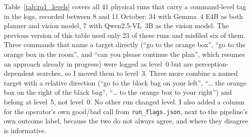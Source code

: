 %
%

\label{sec:rq1_results}

Table~\ref{tab:rq1_levels} covers all 41 physical runs that carry a command-level tag in the logs, recorded between
8 and 11 October: 34 with Gemma~4 E4B as both planner and vision model, 7 with Qwen2.5-VL~3B as the vision model.
The previous version of this table used only 23 of these runs and misfiled six of them. Three commands that name a
target directly (``go to the orange box'', ``go to the orange box in the room'', and ``can you please continue the
plan'', which resumes an approach already in progress) were logged as level~0 but are perception-dependent
searches, so I moved them to level~3. Three more combine a named target with a relative direction (``go to the
black bag on your left'', ``\ldots{} the orange box on the right of the black bag'', ``\ldots{} to the orange box
to your right'') and belong at level~5, not level~0. No other run changed level. I also added a column for the
operator's own good/bad call from \texttt{run\_flags.json}, next to the pipeline's own outcome label, because the
two do not always agree, and where they disagree is informative.

